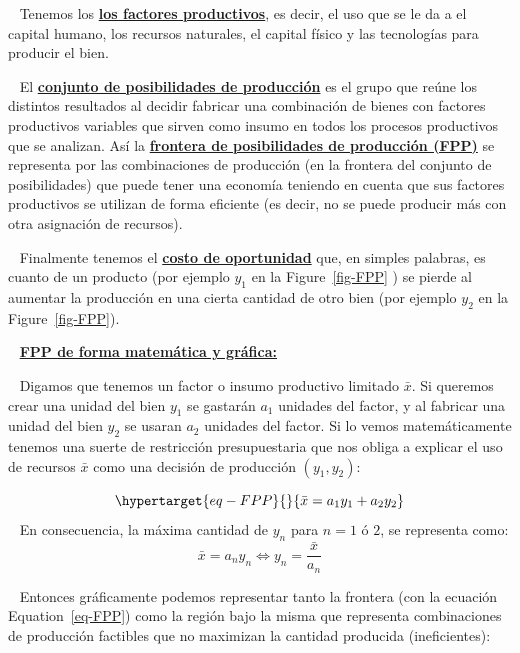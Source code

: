 \documentclass[
  letterpaper,
  DIV=11,
  numbers=noendperiod]{scrreport}
\begin{document}
~ Tenemos los \ul{\textbf{los factores productivos}}, es decir, el uso
que se le da a el capital humano, los recursos naturales, el capital
físico y las tecnologías para producir el bien.

~ El \ul{\textbf{conjunto de posibilidades de producción}} es el grupo
que reúne los distintos resultados al decidir fabricar una combinación
de bienes con factores productivos variables que sirven como insumo en
todos los procesos productivos que se analizan. Así la
\ul{\textbf{frontera de posibilidades de producción (FPP)}} se
representa por las combinaciones de producción (en la frontera del
conjunto de posibilidades) que puede tener una economía teniendo en
cuenta que sus factores productivos se utilizan de forma eficiente (es
decir, no se puede producir más con otra asignación de recursos).

~ Finalmente tenemos el \ul{\textbf{costo de oportunidad}} que, en
simples palabras, es cuanto de un producto (por ejemplo \(y_1\) en la
Figure~\ref{fig-FPP} ) se pierde al aumentar la producción en una cierta
cantidad de otro bien (por ejemplo \(y_2\) en la Figure~\ref{fig-FPP}).

~ \textbf{\ul{FPP de forma matemática y gráfica:}}

~ Digamos que tenemos un factor o insumo productivo limitado \(\bar x\).
Si queremos crear una unidad del bien \(y_1\) se gastarán \(a_1\)
unidades del factor, y al fabricar una unidad del bien \(y_2\) se usaran
\(a_2\) unidades del factor. Si lo vemos matemáticamente tenemos una
suerte de restricción presupuestaria que nos obliga a explicar el uso de
recursos \(\bar x\) como una decisión de producción \((y_1,y_2)\):

\begin{equation}\protect\hypertarget{eq-FPP}{}{
\bar x=a_1y_1+a_2y_2
}\label{eq-FPP}\end{equation} ~ En consecuencia, la máxima cantidad de
\(y_n\) para \(n = 1\) ó \(2\), se representa como: \[
\bar x=a_ny_n \Leftrightarrow y_n=\frac{\bar x}{a_n}
\]

~ Entonces gráficamente podemos representar tanto la frontera (con la
ecuación Equation~\ref{eq-FPP}) como la región bajo la misma que
representa combinaciones de producción factibles que no maximizan la
cantidad producida (ineficientes):
\end{document}
